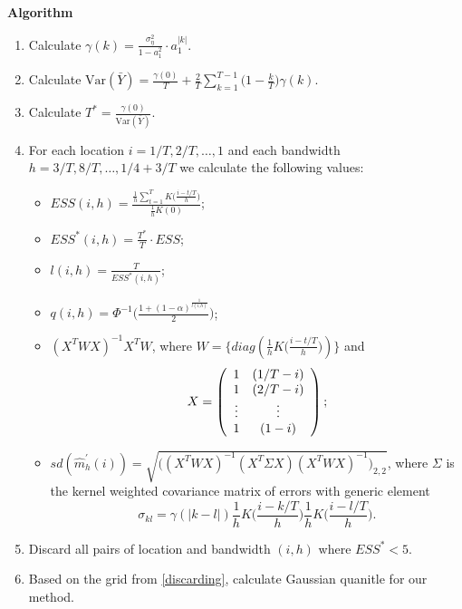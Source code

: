 \documentclass[12pt,a4paper]{letter}
\newcommand{\Var}{\mathrm{Var}}
\begin{document}
\pagestyle{empty}

\textbf{Algorithm}

\begin{enumerate}
	\item Calculate $\gamma(k) = \frac{\sigma_\eta^2 }{1 - a_1^2}\cdot a_1^{|k|}$.
	\item Calculate $\Var(\bar{Y}) = \frac{\gamma(0)}{T} + \frac{2}{T} \sum_{k = 1}^{T-1} \big(1 - \frac{k}{T}\big)\gamma(k)$.
	\item Calculate $T^* = \frac{\gamma(0)}{\Var(\bar{Y})}$.
	\item For each location $i = 1/T, 2/T, \ldots, 1$ and each bandwidth $h = 3/T, 8/T,\ldots, 1/4 + 3/T$ we calculate the following values:
	\begin{itemize}
		\item $ESS(i, h) = \frac{\frac{1}{h}\sum_{t =1}^T K\big(\frac{i - t/T}{h}\big)}{\frac{1}{h}K(0)}$;
		\item $ESS^*(i, h) =\frac{T^*}{T} \cdot ESS$;
		\item $l(i, h) = \frac{T}{ESS^*(i, h)}$;
		\item $q(i, h) = \Phi^{-1} \Big(\frac{1 + (1 - \alpha)^{\frac{1}{l(i, h)}}}{2}\Big)$;
		\item $(X^T W X)^{-1} X^T W$, where $W = \{diag(\frac{1}{h} K\big(\frac{i - t/T}{h}\big))\}$ and 
			\begin{equation}
			X =  \left( \begin{array}{c c}
   					1 & (1/T - i) \\
					1 & (2/T - i)  \\
					\vdots & \vdots \\
					1 & (1 - i)  \\
				   \end{array} \right); \nonumber
			\end{equation}
		\item $sd(\widehat{m}^\prime_h(i)) = \sqrt{\big((X^T W X)^{-1} (X^T \Sigma X) (X^T W X)^{-1}\big)_{2, 2}}$, where $\Sigma$ is the kernel weighted covariance matrix of errors with generic element $$\sigma_{kl} = \gamma(|k - l|) \frac{1}{h} K\Big(\frac{i - k/T}{h}\Big) \frac{1}{h}  K\Big(\frac{i - l/T}{h}\Big).$$
	\end{itemize}
	\item\label{discarding} Discard all pairs of location and bandwidth $(i, h)$ where $ESS^* < 5$.
	\item Based on the grid from \ref{discarding}, calculate Gaussian quanitle for our method.

\end{enumerate}
\end{document}
